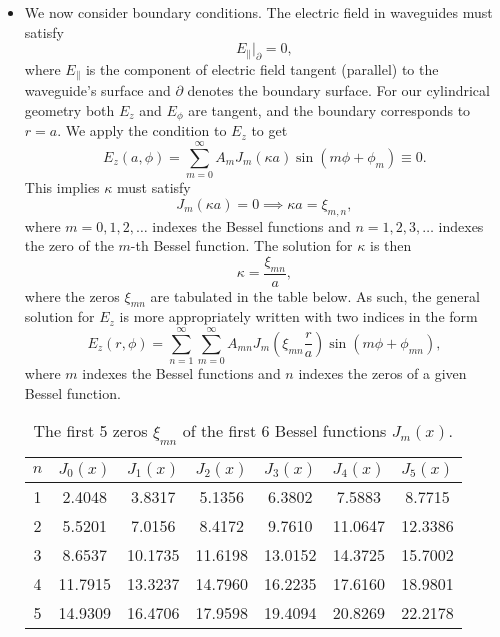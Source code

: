 \documentclass[11pt, a4paper]{article}
\begin{document}
\begin{itemize}
	\item We now consider boundary conditions. The electric field in waveguides must satisfy
	\begin{equation*}
		E_{\parallel} \big|_{\partial} = 0,
	\end{equation*}
    where $ E_{\parallel} $ is the component of electric field tangent (parallel) to the waveguide's surface and $ \partial $ denotes the boundary surface. For our cylindrical geometry both $ E_{z} $ and $ E_{\phi} $ are tangent, and the boundary corresponds to $ r = a $. We apply the condition to $ E_{z} $ to get
	\begin{equation*}
        E_{z}(a, \phi) = \sum_{m = 0}^{\infty}A_{m}J_{m}(\kappa a)\sin(m \phi + \phi_{m}) \equiv 0  .
	\end{equation*}
	This implies $ \kappa $ must satisfy
	\begin{equation*}
		J_{m}(\kappa a) = 0 \implies \kappa a = \xi_{m, n},
	\end{equation*}
    where $ m = 0, 1, 2, \ldots $ indexes the Bessel functions and $ n = 1, 2, 3, \ldots $ indexes the zero of the $ m $-th Bessel function. The solution for $ \kappa $ is then
	\begin{equation*}
		\kappa = \frac{\xi_{mn}}{a},
	\end{equation*}
	where the zeros $ \xi_{mn} $ are tabulated in the table below. As such, the general solution for $ E_{z} $ is more appropriately written with two indices in the form
    \begin{equation*}
        E_{z}(r, \phi) = \sum_{n=1}^{\infty}\sum_{m = 0}^{\infty}A_{mn}J_{m}\left( \xi_{mn} \frac{r}{a} \right)\sin(m \phi + \phi_{mn}),
    \end{equation*}
    where $ m $ indexes the Bessel functions and $ n $ indexes the zeros of a given Bessel function.

	
\begin{table}[htb!]
    \centering
    \begin{tabular}{c|c|c|c|c|c|c}
        $ n $ & $ J_0(x) $ & $ J_1(x) $ & $ J_2(x) $ & $ J_3(x) $ & $ J_4(x) $ & $ J_5(x) $ \\
        \hline 
        1 & 2.4048 & 3.8317 & 5.1356 & 6.3802 & 7.5883 & 8.7715\\
        2 & 5.5201 & 7.0156 & 8.4172 & 9.7610 & 11.0647 & 12.3386\\
        3 & 8.6537 & 10.1735 & 11.6198 & 13.0152 & 14.3725 & 15.7002\\
        4 & 11.7915 & 13.3237 & 14.7960 & 16.2235 & 17.6160 & 18.9801\\
        5 & 14.9309 & 16.4706 & 17.9598 & 19.4094 & 20.8269 & 22.2178\\
    \end{tabular}
    \caption{The first 5 zeros $ \xi_{mn} $ of the first 6 Bessel functions $ J_{m}(x) $.}
\end{table}


\end{itemize}
\end{document}
